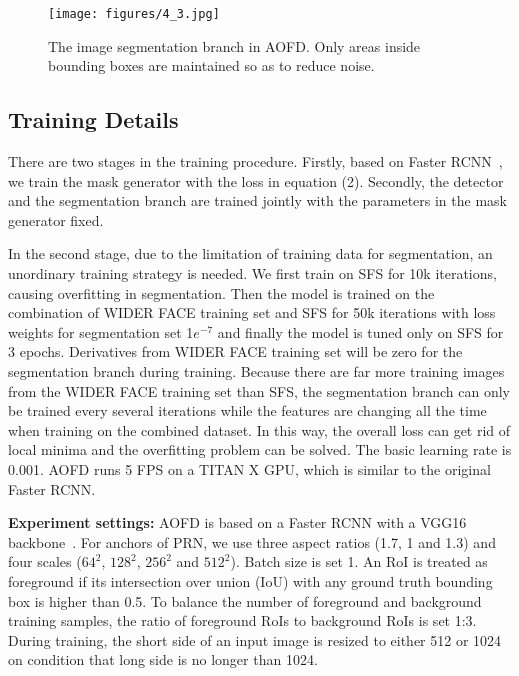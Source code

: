 \documentclass[10pt,twocolumn,letterpaper]{article}
\begin{document}
\begin{figure}[t]
	\begin{center}
		\texttt{[image: figures/4\_3.jpg]}
	\end{center}
	\vspace{-6pt}
	\caption{The image segmentation branch in AOFD. Only areas inside bounding boxes are maintained so as to reduce noise.}
	\vspace{-10pt}
	\label{fig:segmentation}
\end{figure}


\subsection{Training Details}
There are two stages in the training procedure. Firstly, based on Faster RCNN~\cite{ren2015faster}, we train the mask generator with the loss in equation (2). Secondly, the detector and the segmentation branch are trained jointly with the parameters in the mask generator fixed. 

In the second stage, due to the limitation of training data for segmentation, an unordinary training strategy is needed. We first train on SFS for 10k iterations, causing overfitting in segmentation. Then the model is trained on the combination of WIDER FACE training set and SFS for 50k iterations with loss weights for segmentation set 1$e^{-7}$ and finally the model is tuned only on SFS for 3 epochs. Derivatives from WIDER FACE training set will be zero for the segmentation branch during training. Because there are far more training images from the WIDER FACE training set than SFS, the segmentation branch can only be trained every several iterations while the features are changing all the time when training on the combined dataset. In this way, the overall loss can get rid of local minima and the overfitting problem can be solved. The basic learning rate is 0.001. AOFD runs 5 FPS on a TITAN X GPU, which is similar to the original Faster RCNN.

\textbf{Experiment settings:} AOFD is based on a Faster RCNN with a VGG16 backbone~\cite{simonyan2014very}. For anchors of PRN, we use three aspect ratios (1.7, 1 and 1.3) and four scales ($64^2$, $128^2$, $256^2$ and $512^2$). Batch size is set 1. An RoI is treated as foreground if its intersection over union (IoU) with any ground truth bounding box is higher than 0.5. To balance the number of foreground and background training samples, the ratio of foreground RoIs to background RoIs is set 1:3. During training, the short side of an input image is resized to either 512 or 1024 on condition that long side is no longer than 1024. 
\end{document}
